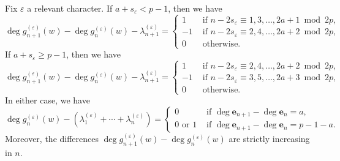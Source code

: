 \begin{proposition}
    \label{P:increment_of_degrees_in_ghost_series}
    Fix $\varepsilon$ a relevant character.  If $a+s_\varepsilon<p-1$, then we have
    \begin{equation}
    \label{E:increment_of_degree_a_plus_s_lt_p-1}
    \deg g_{n+1}^{(\varepsilon)}(w) - \deg g_{n}^{(\varepsilon)}(w) - \lambda_{n+1}^{(\varepsilon)} =\begin{cases}
    1 & \textrm{ if } n - 2s_\varepsilon \equiv 1, 3, \dots, 2a+1 \bmod {2p},
    \\
    -1 & \textrm{ if } n- 2s_{\varepsilon} \equiv 2, 4, \dots, 2a+2 \bmod{2p},
    \\
    0 & \textrm{ otherwise.}
    \end{cases}
    \end{equation}
    If $a+s_\varepsilon\geq p-1$, then we have
    \begin{equation}
    \label{E:increment_of_degree_a_plus_s_ge_p-1}
    \deg g_{n+1}^{(\varepsilon)}(w) - \deg g_{n}^{(\varepsilon)}(w) - \lambda_{n+1}^{(\varepsilon)} =\begin{cases}
    1 & \textrm{ if } n - 2s_\varepsilon \equiv 2, 4, \dots, 2a+2 \bmod {2p},
    \\
    -1 & \textrm{ if } n- 2s_{\varepsilon} \equiv 3, 5, \dots, 2a+3 \bmod{2p},
    \\
    0 & \textrm{ otherwise.}
    \end{cases}
    \end{equation}
    In either case, we have
    \begin{equation}
    \label{E:degree_approx_halo_bound}
    \deg g_n^{(\varepsilon)}(w) - (\lambda_1^{(\varepsilon)}+\cdots + \lambda_n^{(\varepsilon)}) = \begin{cases}
    0 & \textrm{ if }\deg {\mathbf{e}}_{n+1}-\deg{\mathbf{e}}_n = a,\\
    0 \textrm{ or }1 & \textrm{ if }\deg {\mathbf{e}}_{n+1}-\deg{\mathbf{e}}_n = p-1-a.
    \end{cases}
    \end{equation}
    Moreover, the differences $\deg g_{n+1}^{(\varepsilon)}(w) - \deg g_n^{(\varepsilon)}(w)$ are strictly increasing in $n$.
\end{proposition}


